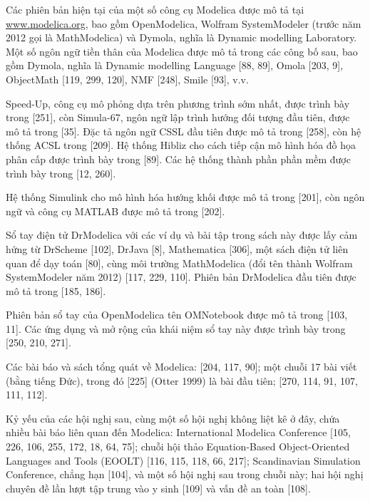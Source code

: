 Các phiên bản hiện tại của một số công cụ Modelica được mô tả tại \url{www.modelica.org}, bao gồm OpenModelica, Wolfram SystemModeler (trước năm 2012 gọi là MathModelica) và Dymola, nghĩa là Dynamic modelling Laboratory. Một số ngôn ngữ tiền thân của Modelica được mô tả trong các công bố sau, bao gồm Dymola, nghĩa là Dynamic modelling Language [88, 89], Omola [203, 9], ObjectMath [119, 299, 120], NMF [248], Smile [93], v.v.

Speed-Up, công cụ mô phỏng dựa trên phương trình sớm nhất, được trình bày trong [251], còn Simula-67, ngôn ngữ lập trình hướng đối tượng đầu tiên, được mô tả trong [35]. Đặc tả ngôn ngữ CSSL đầu tiên được mô tả trong [258], còn hệ thống ACSL trong [209]. Hệ thống Hibliz cho cách tiếp cận mô hình hóa đồ họa phân cấp được trình bày trong [89]. Các hệ thống thành phần phần mềm được trình bày trong [12, 260].

Hệ thống Simulink cho mô hình hóa hướng khối được mô tả trong [201], còn ngôn ngữ và công cụ MATLAB được mô tả trong [202].

Sổ tay điện tử DrModelica với các ví dụ và bài tập trong sách này được lấy cảm hứng từ DrScheme [102], DrJava [8], Mathematica [306], một sách điện tử liên quan để dạy toán [80], cùng môi trường MathModelica (đổi tên thành Wolfram SystemModeler năm 2012) [117, 229, 110]. Phiên bản DrModelica đầu tiên được mô tả trong [185, 186].

Phiên bản sổ tay của OpenModelica tên OMNotebook được mô tả trong [103, 11]. Các ứng dụng và mở rộng của khái niệm sổ tay này được trình bày trong [250, 210, 271].

Các bài báo và sách tổng quát về Modelica: [204, 117, 90]; một chuỗi 17 bài viết (bằng tiếng Đức), trong đó [225] (Otter 1999) là bài đầu tiên; [270, 114, 91, 107, 111, 112].

Kỷ yếu của các hội nghị sau, cùng một số hội nghị không liệt kê ở đây, chứa nhiều bài báo liên quan đến Modelica: International Modelica Conference [105, 226, 106, 255, 172, 18, 64, 75]; chuỗi hội thảo Equation-Based Object-Oriented Languages and Tools (EOOLT) [116, 115, 118, 66, 217]; Scandinavian Simulation Conference, chẳng hạn [104], và một số hội nghị sau trong chuỗi này; hai hội nghị chuyên đề lần lượt tập trung vào y sinh [109] và vấn đề an toàn [108].

